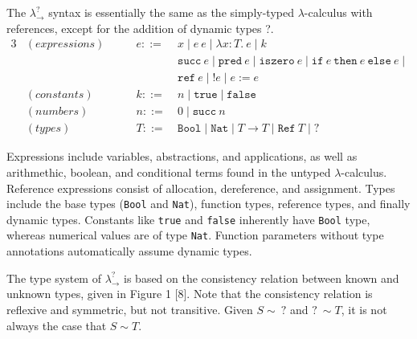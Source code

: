 The $\lambda ^? _{\rightarrow}$ syntax is essentially the same as 
the simply-typed $\lambda$-calculus with references, except for the 
addition of dynamic types ?.
\begin{alignat*}{3}
    &(\textit{expressions}) \qquad 
    & e ::= \: & x \; | \;  
          e \: e \; | \;
          \lambda x \! : \! T . \: e \; | \;
          k \\
    &&    & \texttt{succ} \: e \; | \;
          \texttt{pred} \: e \; | \;
          \texttt{iszero} \: e \; | \;
          \texttt{if} \: e \: \texttt{then} \: e \: \texttt{else} \: e \; | \; \\
    &&    & \texttt{ref} \: e \; | \;
          !e \; | \;
          e := e \\
    &(\textit{constants}) 
    & k ::= \: & n \; | \; \texttt{true} \; | \; \texttt{false} \\
    &(\textit{numbers}) 
    & n ::= \: & 0 \; | \; \texttt{succ} \: n \\
    &(\textit{types}) 
    & T ::= \: & \texttt{Bool} \; | \;
            \texttt{Nat} \; | \;
            T \rightarrow T \; | \;
            \texttt{Ref} \: T \; | \;
            ?     
\end{alignat*}

Expressions include variables, abstractions, and applications, as well as 
arithmethic, boolean, and conditional terms found in the untyped $\lambda$-calculus. 
Reference expressions consist of allocation, dereference, and assignment.
Types include the base types (\texttt{Bool} and \texttt{Nat}), function 
types, reference types, and finally dynamic types. 
Constants like \texttt{true} and \texttt{false} inherently  
have \texttt{Bool} type, whereas numerical values are of type \texttt{Nat}. 
Function parameters without type annotations automatically 
assume dynamic types. 

The type system of $\lambda ^? _{\rightarrow}$ is based on the 
consistency relation between known and unknown types, given in 
Figure 1 [8]. Note that the consistency relation is reflexive and 
symmetric, but not transitive. Given $S \sim \: ?$ and $? \: \sim T$, it 
is not always the case that $S \sim T$.  



